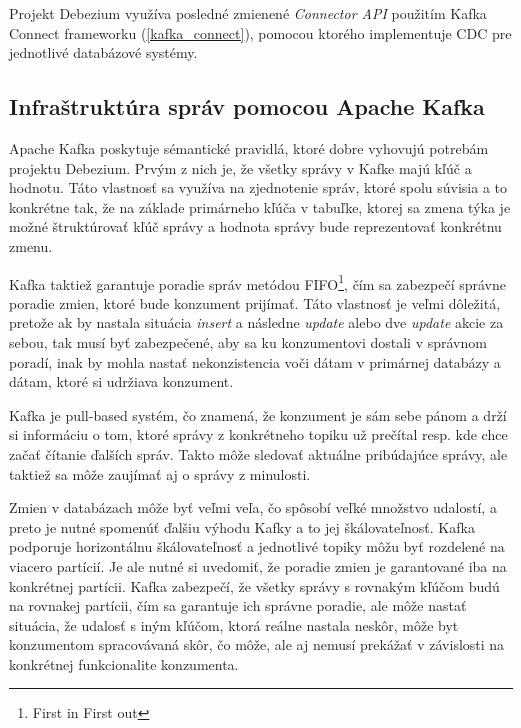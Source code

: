 Projekt Debezium využíva posledné zmienené \textit{Connector API} použitím Kafka Connect frameworku (\ref{kafka_connect}), pomocou ktorého implementuje CDC pre jednotlivé databázové systémy.

\subsection{Infraštruktúra správ pomocou Apache Kafka}
Apache Kafka poskytuje sémantické pravidlá, ktoré dobre vyhovujú potrebám projektu Debezium. Prvým z nich je, že všetky správy v Kafke majú kľúč a hodnotu. Táto vlastnosť sa využíva na zjednotenie správ, ktoré spolu súvisia a to konkrétne tak, že na základe primárneho kľúča v tabuľke, ktorej sa zmena týka je možné štruktúrovať kľúč správy a hodnota správy bude reprezentovať konkrétnu zmenu.

Kafka taktiež garantuje poradie správ metódou FIFO\footnote{First in First out}, čím sa zabezpečí správne poradie zmien, ktoré bude konzument prijímať. Táto vlastnosť je veľmi dôležitá, pretože ak by nastala situácia \textit{insert} a následne \textit{update} alebo dve \textit{update} akcie za sebou, tak musí byť zabezpečené, aby sa ku konzumentovi dostali v správnom poradí, inak by mohla nastať nekonzistencia voči dátam v primárnej databázy a dátam, ktoré si udržiava konzument.

Kafka je pull-based systém, čo znamená, že konzument je sám sebe pánom a drží si informáciu o tom, ktoré správy z konkrétneho topiku už prečítal resp. kde chce začať čítanie ďalších správ. Takto môže sledovať aktuálne pribúdajúce správy, ale taktiež sa môže zaujímať aj o správy z minulosti.

Zmien v databázach môže byť veľmi veľa, čo spôsobí veľké množstvo udalostí, a preto je nutné spomenúť ďalšiu výhodu Kafky a to jej škálovateľnosť. Kafka podporuje horizontálnu škálovateľnosť a jednotlivé topiky môžu byť rozdelené na viacero partícií. Je ale nutné si uvedomiť, že poradie zmien je garantované iba na konkrétnej partícii. Kafka zabezpečí, že všetky správy s rovnakým kľúčom budú na rovnakej partícii, čím sa garantuje ich správne poradie, ale môže nastať situácia, že udalosť s iným kľúčom, ktorá reálne nastala neskôr, môže byt konzumentom spracovávaná skôr, čo môže, ale aj nemusí prekážať v závislosti na konkrétnej funkcionalite konzumenta.

